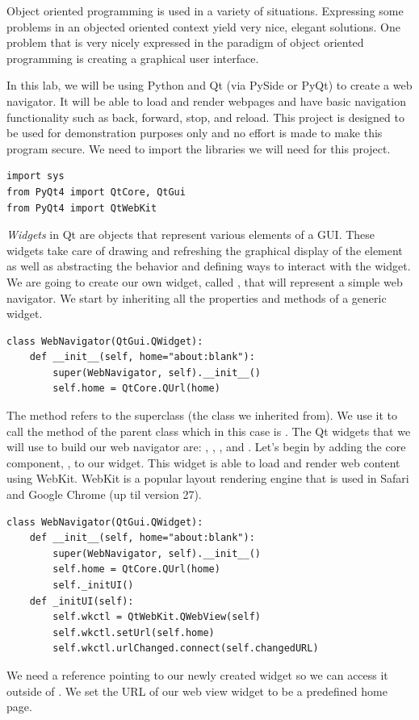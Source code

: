 
Object oriented programming is used in a variety of situations.
Expressing some problems in an objected oriented context yield very nice, elegant solutions.
One problem that is very nicely expressed in the paradigm of object oriented programming is
creating a graphical user interface.

In this lab, we will be using Python and Qt (via PySide or PyQt) to create a web navigator.
It will be able to load and render webpages and have basic navigation functionality such as
back, forward, stop, and reload.  This project is designed to be used for demonstration purposes only and no effort is made to make this program secure.
We need to import the libraries we will need for this project.
\begin{lstlisting}
import sys
from PyQt4 import QtCore, QtGui
from PyQt4 import QtWebKit
\end{lstlisting}

\emph{Widgets} in Qt are objects that represent various elements of a GUI.
These widgets take care of drawing and refreshing the graphical display of the element as well as
abstracting the behavior and defining ways to interact with the widget.
We are going to create our own widget, called , that will represent a simple web navigator.
We start by inheriting all the properties and methods of a generic widget.
\begin{lstlisting}
class WebNavigator(QtGui.QWidget):
    def __init__(self, home="about:blank"):
        super(WebNavigator, self).__init__()
        self.home = QtCore.QUrl(home)
\end{lstlisting}
The  method refers to the superclass (the class we inherited from).  We use it to call the  method of the parent class which in this case is .
The Qt widgets that we will use to build our web navigator are: , ,
, and .
Let's begin by adding the core component, , to our widget.  This widget is able to load and render web content using WebKit.  WebKit is a popular layout rendering engine that is used in Safari and Google Chrome (up til version 27).
\begin{lstlisting}
class WebNavigator(QtGui.QWidget):
    def __init__(self, home="about:blank"):
        super(WebNavigator, self).__init__()
        self.home = QtCore.QUrl(home)
        self._initUI()
    def _initUI(self):
        self.wkctl = QtWebKit.QWebView(self)
        self.wkctl.setUrl(self.home)
        self.wkctl.urlChanged.connect(self.changedURL)
\end{lstlisting}
We need a reference pointing to our newly created  widget so we can access it outside of .  We set the URL of our web view widget to be a predefined home page.  

